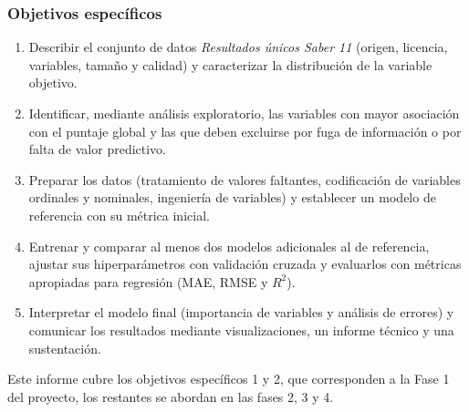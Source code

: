         \subsubsection{Objetivos específicos}
            \begin{enumerate}
                \item Describir el conjunto de datos \textit{Resultados únicos
                Saber 11} (origen, licencia, variables, tamaño y calidad) y
                caracterizar la distribución de la variable objetivo.

                \item Identificar, mediante análisis exploratorio, las variables
                con mayor asociación con el puntaje global y las que deben
                excluirse por fuga de información o por falta de valor predictivo.

                \item Preparar los datos (tratamiento de valores faltantes,
                codificación de variables ordinales y nominales, ingeniería de
                variables) y establecer un modelo de referencia con su métrica
                inicial.

                \item Entrenar y comparar al menos dos modelos adicionales al de
                referencia, ajustar sus hiperparámetros con validación cruzada y
                evaluarlos con métricas apropiadas para regresión (MAE, RMSE y
                $R^2$).

                \item Interpretar el modelo final (importancia de variables y
                análisis de errores) y comunicar los resultados mediante
                visualizaciones, un informe técnico y una sustentación.
            \end{enumerate}

            Este informe cubre los objetivos específicos 1 y 2, que corresponden
            a la Fase 1 del proyecto, los restantes se abordan en las fases 2, 3 y
            4.

